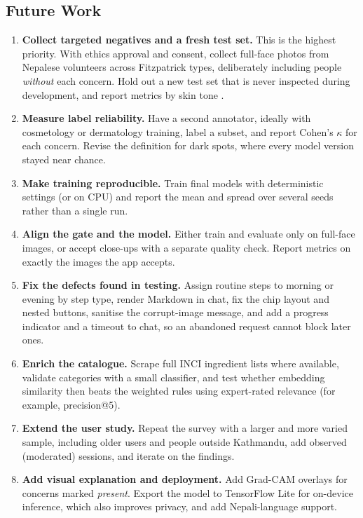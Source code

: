 \subsection{Future Work}

\begin{enumerate}
  \item \textbf{Collect targeted negatives and a fresh test set.} This is the highest priority. With ethics approval and consent, collect full-face photos from Nepalese volunteers across Fitzpatrick types, deliberately including people \emph{without} each concern. Hold out a new test set that is never inspected during development, and report metrics by skin tone \citep{groh2021}.
  \item \textbf{Measure label reliability.} Have a second annotator, ideally with cosmetology or dermatology training, label a subset, and report Cohen's $\kappa$ for each concern. Revise the definition for dark spots, where every model version stayed near chance.
  \item \textbf{Make training reproducible.} Train final models with deterministic settings (or on CPU) and report the mean and spread over several seeds rather than a single run.
  \item \textbf{Align the gate and the model.} Either train and evaluate only on full-face images, or accept close-ups with a separate quality check. Report metrics on exactly the images the app accepts.
  \item \textbf{Fix the defects found in testing.} Assign routine steps to morning or evening by step type, render Markdown in chat, fix the chip layout and nested buttons, sanitise the corrupt-image message, and add a progress indicator and a timeout to chat, so an abandoned request cannot block later ones.
  \item \textbf{Enrich the catalogue.} Scrape full INCI ingredient lists where available, validate categories with a small classifier, and test whether embedding similarity then beats the weighted rules using expert-rated relevance (for example, precision@5).
  \item \textbf{Extend the user study.} Repeat the survey with a larger and more varied sample, including older users and people outside Kathmandu, add observed (moderated) sessions, and iterate on the findings.
  \item \textbf{Add visual explanation and deployment.} Add Grad-CAM overlays \citep{selvaraju2020} for concerns marked \emph{present}. Export the model to TensorFlow Lite for on-device inference, which also improves privacy, and add Nepali-language support.
\end{enumerate}
